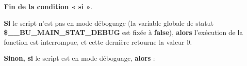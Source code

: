 \documentclass[a4paper,10pt]{article}
\begin{document}
\begin{justify}
    \textbf{\color{cond}Fin de la condition « si »}.
\end{justify}

\setlength{\parskip}{2em}


\begin{justify}
    \textbf{\color{cond}Si} le script n'est pas en mode déboguage (la variable globale de statut \textbf{\color{vars}\$\_\_BU\_MAIN\_STAT\_DEBUG} est fixée à \textbf{false}), \textbf{\color{cond}alors} l'exécution de la fonction est interrompue, et cette dernière retourne la valeur 0.
\end{justify}

\setlength{\parskip}{1em}

\begin{justify}
    \textbf{\color{cond}Sinon, si} le script est en mode déboguage, \textbf{\color{cond}alors} :
\end{justify}
\end{document}
